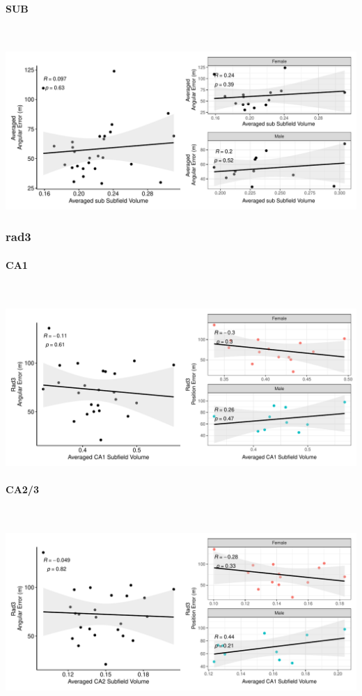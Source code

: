 \documentclass[
]{article}
\begin{document}
\paragraph{SUB}

~ \vspace{1cm}

\includegraphics{hippocampal_subfield_files/figure-latex/unnamed-chunk-7-1.pdf}

\newpage
\subsubsection{rad3}

\paragraph{CA1}

~ \vspace{1cm}

\includegraphics{hippocampal_subfield_files/figure-latex/unnamed-chunk-8-1.pdf}

\paragraph{CA2/3}

~ \vspace{1cm}

\includegraphics{hippocampal_subfield_files/figure-latex/unnamed-chunk-9-1.pdf}
\end{document}
